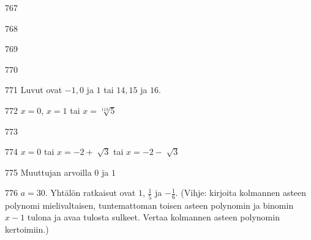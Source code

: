 \begin{Vastaus}{767}
    
\end{Vastaus}
\begin{Vastaus}{768}
\end{Vastaus}
\begin{Vastaus}{769}
    
\end{Vastaus}
\begin{Vastaus}{770}
    
\end{Vastaus}
\begin{Vastaus}{771}
	Luvut ovat $-1, 0$ ja $1$ tai $14, 15$ ja $16$.
    
\end{Vastaus}
\begin{Vastaus}{772}
		$x = 0$, $x = 1$ tai $x = \sqrt[113]{5}$
	
\end{Vastaus}
\begin{Vastaus}{773}
    
\end{Vastaus}
\begin{Vastaus}{774}
	$x=0$ tai $x=-2 + \sqrt[]{3}$ tai $x=-2 - \sqrt[]{3}$
	
\end{Vastaus}
\begin{Vastaus}{775}
Muuttujan arvoilla $0$ ja $1$
	
\end{Vastaus}
\begin{Vastaus}{776}
      $a=30$. Yhtälön ratkaisut ovat $1$, $\frac{1}{5}$ ja $-\frac{1}{6}$. (Vihje: kirjoita kolmannen asteen polynomi mielivaltaisen, tuntemattoman toisen asteen polynomin ja binomin $x-1$ tulona ja avaa tulosta sulkeet. Vertaa kolmannen asteen polynomin kertoimiin.)
    
\end{Vastaus}
